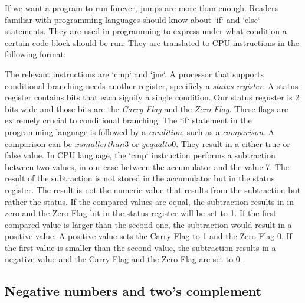 If we want a program to run forever, jumps are more than enough. Readers familiar with programming languages should know about `if` and `else` statements. They are used in programming to express
under what condition a certain code block should be run. They are translated to CPU instructions
in the following format:
\newline
\bigskip
\raggedright
The relevant instructions are `cmp` and `jne`. A processor that supports conditional branching needs
another register, specificly a \textit{status register}. A status register contains bits that each signify
a single condition. Our status reguster is 2 bits wide and those bits are the \textit{Carry Flag} and
the \textit{Zero Flag}. These flags are extremely crucial to conditional branching. The `if` statement
in the programming language is followed by a \textit{condition}, such as a \textit{comparison}. A comparison
can be $x smaller than 3$ or $y equal to 0$. They result in a either true or false value. In 
CPU language, the `cmp` instruction performs a subtraction between two values, in our case between
the accumulator and the value 7. The result of the subtraction is not stored in the accumulator
but in the status register. The result is not the numeric value that results from the subtraction 
but rather the status. If the compared values are equal, the subtraction results in in zero and the
Zero Flag bit in the status register will be set to 1. If the first compared value is larger than the second one, the subtraction would result in a positive value. A positive value sets the
Carry Flag to 1 and the Zero Flag 0.
If the first value is smaller than the second value, the subtraction results in a negative value and
the Carry Flag and the Zero Flag are set to 0 .


\subsection{Negative numbers and two's complement}

